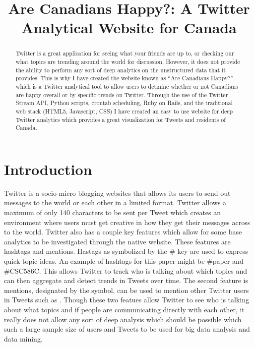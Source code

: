 \documentclass[conference]{IEEEtran}
\begin{document}
\title{Are Canadians Happy?: A Twitter Analytical Website for Canada}

\author{
}

\maketitle


\begin{abstract}
Twitter is a great application for seeing what your friends are up to, or checking our
what topics are trending around the world for discussion. However, it does not provide the
ability to perform any sort of deep analytics on the unstructured data that it provides. This
is why I have created the website known as ``Are Canadians Happy?'' which is a Twitter
analytical tool to allow users to detmine whether or not Canadians are happy overall or
by specific trends on Twitter. Through the use of the Twitter Stream API, Python scripts,
crontab scheduling, Ruby on Rails, and the traditional web stack (HTML5, Javascript, CSS)
I have created an easy to use website for deep Twitter analytics which provides a great
visualization for Tweets and residents of Canada.
\end{abstract}


\section{Introduction}

Twitter is a socio micro blogging websites that allows its users to send out messages to the world or 
each other in a limited format. Twitter allows a maximum of only 140 characters to be sent per Tweet which
creates an environment where users must get creative in how they get their messages across to the world.
Twitter also has a couple key features which allow for some base analytics to be investigated through the
native website. These features are hashtags and mentions. Hastags as symbolized by the \# key are used to 
express quick topic ideas. An example of hashtags for this paper might be \#paper and \#CSC586C. This allows
Twitter to track who is talking about which topics and can then aggregate and detect trends in Tweets over time.
The second feature is mentions, designated by the \@ symbol, can be used to mention other Twitter users
in Tweets such as \@Yvonne. Though these two featues allow Twitter to see who is talking about what topics
and if people are communicating directly with each other, it really does not allow any sort of deep analysis
which should be possible which such a large sample size of users and Tweets to be used for big data analysis
and data mining.
\end{document}
